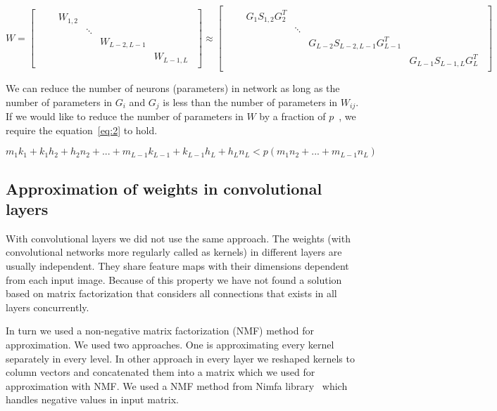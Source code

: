 \documentclass{article} %
\begin{document}
\begin{equation} \label{eq:1}
W = 
\begin{bmatrix} 
\begin{smallmatrix}
& &W_{1,2} & & & \\
& & &\ddots & & \\ 
& & & &W_{L-2,L-1} & \\ 
& & & & &W_{L-1,L} 
\end{smallmatrix}
\end{bmatrix} 
\approx 
\begin{bmatrix} 
\begin{smallmatrix}
& &G_1S_{1,2}G_2^T & & & \\ 
& & &\ddots & & \\ 
& & & &G_{L-2}S_{L-2,L-1}G_{L-1}^T & \\ 
& & & & &G_{L-1}S_{L-1,L}G_L^T 
\end{smallmatrix}
\end{bmatrix}
\end{equation}


We can reduce
the number of neurons (parameters) in network as long as the number of 
parameters
in $G_i$ and $G_j$ is less than the number of parameters in $W_{ij}$. If we 
would
like to reduce the number of parameters in $W$ by a fraction of
$p$~\cite{sainath2013low}, we require the equation~\ref{eq:2} to hold.

\begin{equation} \label{eq:2}
 m_1k_1 + k_1h_2 + h_2n_2 + ... + m_{L-1}k_{L-1} + k_{L-1}h_L + h_Ln_L < 
p(m_1n_2 + ... + m_{L-1}n_L)
\end{equation}

\subsection{Approximation of weights in convolutional layers}

With convolutional layers we did not use the same approach. The weights (with 
convolutional networks more regularly called as kernels) in different layers are 
usually independent. They share feature maps with their dimensions dependent 
from each input image. Because of this property we have not found a solution 
based on matrix factorization that considers all connections that exists in all 
layers concurrently. 

In turn we used a non-negative matrix factorization (NMF) method 
for approximation. We used two approaches. One is approximating every 
kernel separately in every level. In other approach in every layer we reshaped 
kernels to column vectors and concatenated them into a matrix which we used for 
approximation with NMF. We used a NMF method from Nimfa 
library~\citep{Zitnik2012} which handles negative values in input matrix.
\end{document}
